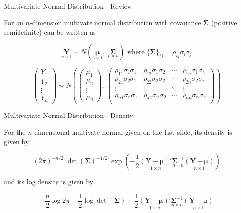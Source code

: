 \documentclass[11pt,ignorenonframetext,]{beamer}
\begin{document}
\begin{frame}[t]{Multivariate Normal Distribution - Review}
\protect\hypertarget{multivariate-normal-distribution---review}{}

For an \(n\)-dimension multivate normal distribution with covariance
\(\symbf{\Sigma}\) (positive semidefinite) can be written as

\[
\underset{n \times 1}{\symbf{Y}} \sim N(\underset{n \times 1}{\symbf{\mu}}, \; \underset{n \times n}{\symbf{\Sigma}}) \text{ where } \{\symbf{\Sigma}\}_{ij} = \rho_{ij} \sigma_i \sigma_j
\]

\[
\begin{pmatrix}
Y_1\\ Y_2\\ \vdots\\ Y_n
\end{pmatrix}
\sim N\left(
\begin{pmatrix}
\mu_1\\ \mu_2\\ \vdots\\ \mu_n
\end{pmatrix}, \,
\begin{pmatrix}
\rho_{11}\sigma_1\sigma_1 & \rho_{12}\sigma_1\sigma_2 & \cdots & \rho_{1n}\sigma_1\sigma_n \\
\rho_{21}\sigma_2\sigma_1 & \rho_{22}\sigma_2\sigma_2 & \cdots & \rho_{2n}\sigma_2\sigma_n\\
\vdots & \vdots & \ddots & \vdots \\
\rho_{n1}\sigma_n\sigma_1 & \rho_{n2}\sigma_n\sigma_2 & \cdots & \rho_{nn}\sigma_n\sigma_n \\
\end{pmatrix}
\right)
\]

\end{frame}

\begin{frame}[t]{Multivariate Normal Distribution - Density}
\protect\hypertarget{multivariate-normal-distribution---density}{}

For the \(n\) dimensional multivate normal given on the last slide, its
density is given by

\[
(2\pi)^{-n/2} \; \det(\symbf{\Sigma})^{-1/2} \; \exp{\left(-\frac{1}{2} \underset{1 \times n}{(\symbf{Y}-\symbf{\mu})'} \underset{n \times n}{\symbf{\Sigma}^{-1}} \underset{n \times 1}{(\symbf{Y}-\symbf{\mu})}\right)} 
\]

and its log density is given by

\[
-\frac{n}{2} \log 2\pi - \frac{1}{2} \log \det(\symbf{\Sigma}) - \frac{1}{2} \underset{1 \times n}{(\symbf{Y}-\symbf{\mu})'} \underset{n \times n}{\symbf{\Sigma}^{-1}} \underset{n \times 1}{(\symbf{Y}-\symbf{\mu})}
\]

\end{frame}
\end{document}
